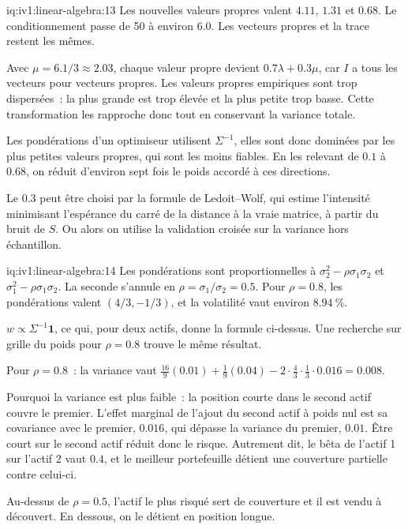 \begin{solution}{iq:iv1:linear-algebra:13}
Les nouvelles valeurs propres valent $4.11$, $1.31$ et $0.68$. Le conditionnement passe de 50 à environ $6.0$. Les vecteurs propres et la trace restent les mêmes.

Avec $\mu = 6.1/3 \approx 2.03$, chaque valeur propre devient $0.7\lambda + 0.3\mu$, car $I$ a tous les vecteurs pour vecteurs propres. Les valeurs propres empiriques sont trop dispersées~: la plus grande est trop élevée et la plus petite trop basse. Cette transformation les rapproche donc tout en conservant la variance totale.

Les pondérations d'un optimiseur utilisent $\Sigma^{-1}$, elles sont donc dominées par les plus petites valeurs propres, qui sont les moins fiables. En les relevant de $0.1$ à $0.68$, on réduit d'environ sept fois le poids accordé à ces directions.

Le $0.3$ peut être choisi par la formule de Ledoit--Wolf, qui estime l'intensité minimisant l'espérance du carré de la distance à la vraie matrice, à partir du bruit de $S$. Ou alors on utilise la validation croisée sur la variance hors échantillon.

\end{solution}

\begin{solution}{iq:iv1:linear-algebra:14}
Les pondérations sont proportionnelles à $\sigma_2^2 - \rho\sigma_1\sigma_2$ et $\sigma_1^2 - \rho\sigma_1\sigma_2$. La seconde s'annule en $\rho = \sigma_1/\sigma_2 = 0.5$. Pour $\rho = 0.8$, les pondérations valent $(4/3, -1/3)$, et la volatilité vaut environ $8.94~\%$.

$w \propto \Sigma^{-1}\mathbf{1}$, ce qui, pour deux actifs, donne la formule ci-dessus. Une recherche sur grille du poids pour $\rho = 0.8$ trouve le même résultat.

Pour $\rho = 0.8$~: la variance vaut $\frac{16}{9}(0.01) + \frac19(0.04) - 2 \cdot \frac43 \cdot \frac13 \cdot 0.016 = 0.008$.

Pourquoi la variance est plus faible~: la position courte dans le second actif couvre le premier. L'effet marginal de l'ajout du second actif à poids nul est sa covariance avec le premier, $0.016$, qui dépasse la variance du premier, $0.01$. Être court sur le second actif réduit donc le risque. Autrement dit, le bêta de l'actif 1 sur l'actif 2 vaut $0.4$, et le meilleur portefeuille détient une couverture partielle contre celui-ci.

Au-dessus de $\rho = 0.5$, l'actif le plus risqué sert de couverture et il est vendu à découvert. En dessous, on le détient en position longue.

\end{solution}

